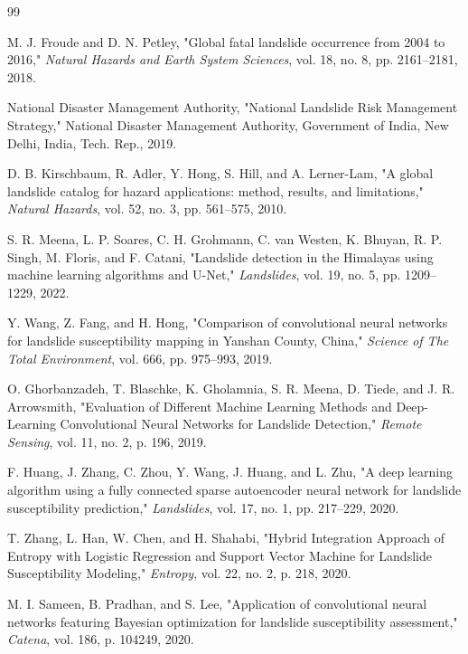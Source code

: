 \documentclass[12pt,a4paper]{report}
\begin{document}
\newpage
{}
\renewcommand{\bibname}{\fontsize{16}{19.2}\selectfont\bfseries\color{thesisblue} References}
\begin{thebibliography}{99}

 M. J. Froude and D. N. Petley, "Global fatal landslide occurrence from 2004 to 2016," \textit{Natural Hazards and Earth System Sciences}, vol. 18, no. 8, pp. 2161--2181, 2018.

 National Disaster Management Authority, "National Landslide Risk Management Strategy," National Disaster Management Authority, Government of India, New Delhi, India, Tech. Rep., 2019.

 D. B. Kirschbaum, R. Adler, Y. Hong, S. Hill, and A. Lerner-Lam, "A global landslide catalog for hazard applications: method, results, and limitations," \textit{Natural Hazards}, vol. 52, no. 3, pp. 561--575, 2010.

 S. R. Meena, L. P. Soares, C. H. Grohmann, C. van Westen, K. Bhuyan, R. P. Singh, M. Floris, and F. Catani, "Landslide detection in the Himalayas using machine learning algorithms and U-Net," \textit{Landslides}, vol. 19, no. 5, pp. 1209--1229, 2022.

 Y. Wang, Z. Fang, and H. Hong, "Comparison of convolutional neural networks for landslide susceptibility mapping in Yanshan County, China," \textit{Science of The Total Environment}, vol. 666, pp. 975--993, 2019.

 O. Ghorbanzadeh, T. Blaschke, K. Gholamnia, S. R. Meena, D. Tiede, and J. R. Arrowsmith, "Evaluation of Different Machine Learning Methods and Deep-Learning Convolutional Neural Networks for Landslide Detection," \textit{Remote Sensing}, vol. 11, no. 2, p. 196, 2019.

 F. Huang, J. Zhang, C. Zhou, Y. Wang, J. Huang, and L. Zhu, "A deep learning algorithm using a fully connected sparse autoencoder neural network for landslide susceptibility prediction," \textit{Landslides}, vol. 17, no. 1, pp. 217--229, 2020.

 T. Zhang, L. Han, W. Chen, and H. Shahabi, "Hybrid Integration Approach of Entropy with Logistic Regression and Support Vector Machine for Landslide Susceptibility Modeling," \textit{Entropy}, vol. 22, no. 2, p. 218, 2020.

 M. I. Sameen, B. Pradhan, and S. Lee, "Application of convolutional neural networks featuring Bayesian optimization for landslide susceptibility assessment," \textit{Catena}, vol. 186, p. 104249, 2020.


\end{thebibliography}
\end{document}
